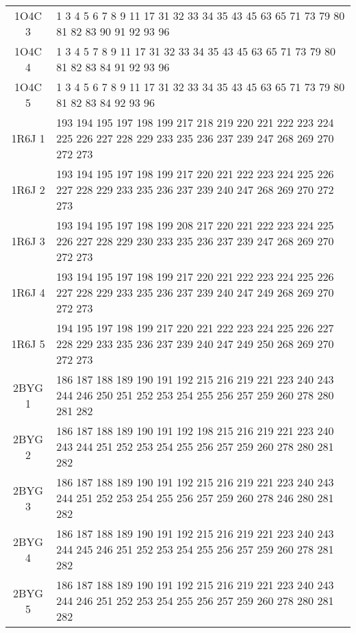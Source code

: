 \begin{table}[!htbp]
{\begin{tabular}{cl}
        1O4C 3 & 1 3 4 5 6 7 8 9 11 17 31 32 33 34 35 43 45 63 65 71 73 79 80 81 82 83 90 91 92 93 96 \\
        1O4C 4 & 1 3 4 5 7 8 9 11 17 31 32 33 34 35 43 45 63 65 71 73 79 80 81 82 83 84 91 92 93 96 \\
        1O4C 5 & 1 3 4 5 6 7 8 9 11 17 31 32 33 34 35 43 45 63 65 71 73 79 80 81 82 83 84 92 93 96 \\
        1R6J 1 & 193 194 195 197 198 199 217 218 219 220 221 222 223 224 225 226 227 228 229 233 235 236 237 239 247 268 269 270 272 273 \\
        1R6J 2 & 193 194 195 197 198 199 217 220 221 222 223 224 225 226 227 228 229 233 235 236 237 239 240 247 268 269 270 272 273 \\
        1R6J 3 & 193 194 195 197 198 199 208 217 220 221 222 223 224 225 226 227 228 229 230 233 235 236 237 239 247 268 269 270 272 273 \\
        1R6J 4 & 193 194 195 197 198 199 217 220 221 222 223 224 225 226 227 228 229 233 235 236 237 239 240 247 249 268 269 270 272 273 \\
        1R6J 5 & 194 195 197 198 199 217 220 221 222 223 224 225 226 227 228 229 233 235 236 237 239 240 247 249 250 268 269 270 272 273 \\
        2BYG 1 & 186 187 188 189 190 191 192 215 216 219 221 223 240 243 244 246 250 251 252 253 254 255 256 257 259 260 278 280 281 282 \\
        2BYG 2 & 186 187 188 189 190 191 192 198 215 216 219 221 223 240 243 244 251 252 253 254 255 256 257 259 260 278 280 281 282 \\
        2BYG 3 & 186 187 188 189 190 191 192 215 216 219 221 223 240 243 244 251 252 253 254 255 256 257 259 260 278 246 280 281 282 \\
        2BYG 4 & 186 187 188 189 190 191 192 215 216 219 221 223 240 243 244 245 246 251 252 253 254 255 256 257 259 260 278 281 282 \\
        2BYG 5 & 186 187 188 189 190 191 192 215 216 219 221 223 240 243 244 246 251 252 253 254 255 256 257 259 260 278 280 281 282 \\

        \bottomrule

      \end{tabular}   
}   
\label{tab:select30}      
\end{table}


